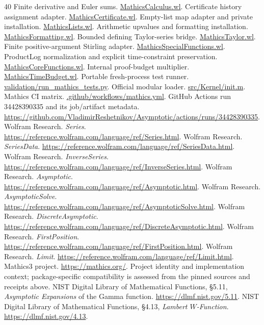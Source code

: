 \documentclass[11pt,letterpaper]{article}
\begin{document}
\begin{thebibliography}{40}
 Finite derivative and Euler sums. \href{\repobase src/Kernel/MathicsCalculus.wl}{MathicsCalculus.wl}.
 Certificate history assignment adapter. \href{\repobase src/Kernel/MathicsCertificate.wl}{MathicsCertificate.wl}.
 Empty-list map adapter and private installation. \href{\repobase src/Kernel/MathicsLists.wl}{MathicsLists.wl}.
 Arithmetic upvalues and formatting installation. \href{\repobase src/Kernel/MathicsFormatting.wl}{MathicsFormatting.wl}.
 Bounded defining Taylor-series bridge. \href{\repobase src/Kernel/MathicsTaylor.wl}{MathicsTaylor.wl}.
 Finite positive-argument Stirling adapter. \href{\repobase src/Kernel/MathicsSpecialFunctions.wl}{MathicsSpecialFunctions.wl}.
 ProductLog normalization and explicit time-constraint preservation. \href{\repobase src/Kernel/MathicsCoreFunctions.wl}{MathicsCoreFunctions.wl}.
 Internal proof-budget multiplier. \href{\repobase src/Kernel/MathicsTimeBudget.wl}{MathicsTimeBudget.wl}.
 Portable fresh-process test runner. \href{\repobase validation/run_mathics_tests.py}{validation/run\_mathics\_tests.py}.
 Official modular loader. \href{\repobase src/Kernel/init.m}{src/Kernel/init.m}.
 Mathics CI matrix. \href{\repobase .github/workflows/mathics.yml}{.github/workflows/mathics.yml}.
 GitHub Actions run 34428390335 and its job/artifact metadata. \url{https://github.com/VladimirReshetnikov/Asymptotic/actions/runs/34428390335}.
 Wolfram Research. \emph{Series}. \url{https://reference.wolfram.com/language/ref/Series.html}.
 Wolfram Research. \emph{SeriesData}. \url{https://reference.wolfram.com/language/ref/SeriesData.html}.
 Wolfram Research. \emph{InverseSeries}. \url{https://reference.wolfram.com/language/ref/InverseSeries.html}.
 Wolfram Research. \emph{Asymptotic}. \url{https://reference.wolfram.com/language/ref/Asymptotic.html}.
 Wolfram Research. \emph{AsymptoticSolve}. \url{https://reference.wolfram.com/language/ref/AsymptoticSolve.html}.
 Wolfram Research. \emph{DiscreteAsymptotic}. \url{https://reference.wolfram.com/language/ref/DiscreteAsymptotic.html}.
 Wolfram Research. \emph{FirstPosition}. \url{https://reference.wolfram.com/language/ref/FirstPosition.html}.
 Wolfram Research. \emph{Limit}. \url{https://reference.wolfram.com/language/ref/Limit.html}.
 Mathics3 project. \url{https://mathics.org/}. Project identity and implementation context; package-specific compatibility is assessed from the pinned sources and receipts above.
 NIST Digital Library of Mathematical Functions, \S5.11, \emph{Asymptotic Expansions} of the Gamma function. \url{https://dlmf.nist.gov/5.11}.
 NIST Digital Library of Mathematical Functions, \S4.13, \emph{Lambert $W$-Function}. \url{https://dlmf.nist.gov/4.13}.
\end{thebibliography}
\endgroup
\end{document}
